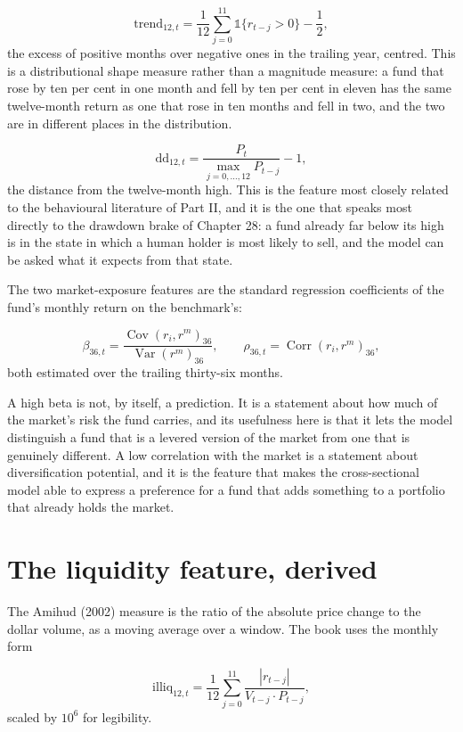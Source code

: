 \[
\mathrm{trend}_{12,t} = \frac{1}{12}\sum_{j=0}^{11}
  \mathbb{1}\{r_{t-j} > 0\} - \frac12,
\]
the excess of positive months over negative ones in the trailing year,
centred. This is a distributional shape measure rather than a magnitude
measure: a fund that rose by ten per cent in one month and fell by ten per
cent in eleven has the same twelve-month return as one that rose in ten
months and fell in two, and the two are in different places in the
distribution.

\[
\mathrm{dd}_{12,t} = \frac{P_t}{\max_{j=0,\dots,12} P_{t-j}} - 1,
\]
the distance from the twelve-month high. This is the feature most closely
related to the behavioural literature of Part II, and it is the one that
speaks most directly to the drawdown brake of Chapter 28: a fund already
far below its high is in the state in which a human holder is most likely
to sell, and the model can be asked what it expects from that state.

The two market-exposure features are the standard regression coefficients
of the fund's monthly return on the benchmark's:

\[
\beta_{36,t} = \frac{\operatorname{Cov}(r_i, r^m)_{36}}{\operatorname{Var}(r^m)_{36}},
\qquad
\rho_{36,t} = \operatorname{Corr}(r_i, r^m)_{36},
\]
both estimated over the trailing thirty-six months.

A high beta is not, by itself, a prediction. It is a statement about how
much of the market's risk the fund carries, and its usefulness here is
that it lets the model distinguish a fund that is a levered version of the
market from one that is genuinely different. A low correlation with the
market is a statement about diversification potential, and it is the
feature that makes the cross-sectional model able to express a preference
for a fund that adds something to a portfolio that already holds the
market.

\section{The liquidity feature, derived}

The Amihud (2002) measure is the ratio of the absolute price change to
the dollar volume, as a moving average over a window. The book uses the monthly
form

\[
\mathrm{illiq}_{12,t} = \frac{1}{12}\sum_{j=0}^{11}
  \frac{|r_{t-j}|}{V_{t-j}\cdot P_{t-j}},
\]
scaled by \(10^6\) for legibility.

